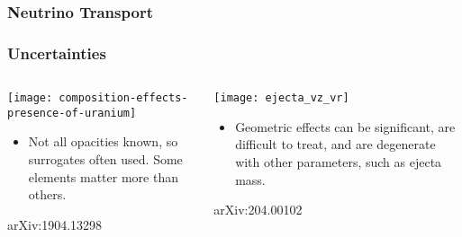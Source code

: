 \documentclass[]{beamer}
\newcommand{\backupend}{
   \setcounter{framenumber}{\value{finalframe}}
}
\begin{document}
\begin{frame}
  \frametitle{Neutrino Transport}
  \begin{center}
  \end{center}
\end{frame}

\begin{frame}
  \frametitle{Uncertainties}
  \begin{columns}
    \begin{column}{6cm}
      \begin{center}
        \texttt{[image: composition-effects-presence-of-uranium]}
      \end{center}
      \begin{itemize}
      \item Not all opacities known, so surrogates often used. Some
        elements matter more than others.
      \end{itemize}
      {\footnotesize arXiv:1904.13298}
    \end{column}
    \begin{column}{6cm}
      \begin{center}
        \texttt{[image: ejecta\_vz\_vr]}
      \end{center}
      \begin{itemize}
      \item Geometric effects can be significant, are difficult to
        treat, and are degenerate with other parameters, such as
        ejecta mass.
      \end{itemize}
      {\footnotesize arXiv:204.00102}
    \end{column}
  \end{columns}
\end{frame}

\backupend
\end{document}
